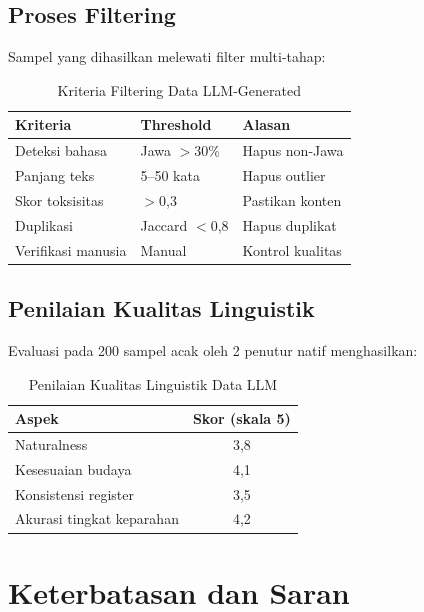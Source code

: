 \documentclass[10pt,twocolumn]{article}
\begin{document}
\subsection{Proses Filtering}

Sampel yang dihasilkan melewati filter multi-tahap:

\begin{table}[H]
\centering
\caption{Kriteria Filtering Data LLM-Generated}
\label{tab:filter}
\begin{tabular}{lll}
\toprule
\textbf{Kriteria} & \textbf{Threshold} & \textbf{Alasan} \\
\midrule
Deteksi bahasa & Jawa $>$30\% & Hapus non-Jawa \\
Panjang teks & 5--50 kata & Hapus outlier \\
Skor toksisitas & $>$0,3 & Pastikan konten \\
Duplikasi & Jaccard $<$0,8 & Hapus duplikat \\
Verifikasi manusia & Manual & Kontrol kualitas \\
\bottomrule
\end{tabular}
\end{table}

\subsection{Penilaian Kualitas Linguistik}

Evaluasi pada 200 sampel acak oleh 2 penutur natif menghasilkan:

\begin{table}[H]
\centering
\caption{Penilaian Kualitas Linguistik Data LLM}
\label{tab:quality}
\begin{tabular}{lc}
\toprule
\textbf{Aspek} & \textbf{Skor (skala 5)} \\
\midrule
Naturalness & 3,8 \\
Kesesuaian budaya & 4,1 \\
Konsistensi register & 3,5 \\
Akurasi tingkat keparahan & 4,2 \\
\bottomrule
\end{tabular}
\end{table}

\section{Keterbatasan dan Saran}
\end{document}
